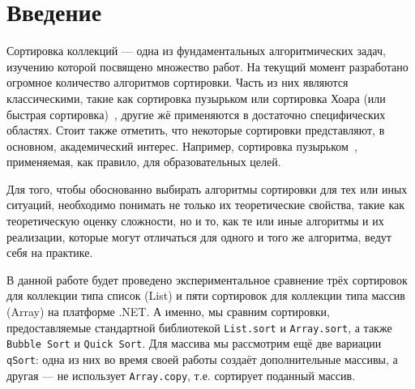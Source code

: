 \section{Введение}

Сортировка коллекций --- одна из фундаментальных алгоритмических задач, изучению которой посвящено множество работ.
На текущий момент разработано огромное количество алгоритмов сортировки.
Часть из них являются классическими, такие как сортировка пузырьком или сортировка Хоара (или быстрая сортировка)~\cite{hoare1962quicksort}, другие жё применяются в достаточно специфических областях.
Стоит также отметить, что некоторые сортировки представляют, в основном, академический интерес.
Например, сортировка пузырьком~\cite{astrachan2003bubble}, применяемая, как правило, для образовательных целей.

Для того, чтобы обоснованно выбирать алгоритмы сортировки для тех или иных ситуаций, необходимо понимать не только их теоретические свойства, такие как теоретическую оценку сложности, но и то, как те или иные алгоритмы и их реализации, которые могут отличаться для одного и того же алгоритма, ведут себя на практике.

В данной работе будет проведено экспериментальное сравнение трёх сортировок для коллекции типа список (List) и пяти сортировок для коллекции типа массив (Array) на платформе .NET.
А именно, мы сравним сортировки, предоставляемые стандартной библиотекой \verb|List.sort| и \verb|Array.sort|, а также \verb|Bubble Sort| и \verb|Quick Sort|. Для массива мы рассмотрим ещё две вариации \verb|qSort|: одна из них во время своей работы создаёт дополнительные массивы, а другая --- не использует \verb|Array.copy|, т.е. сортирует поданный массив.
